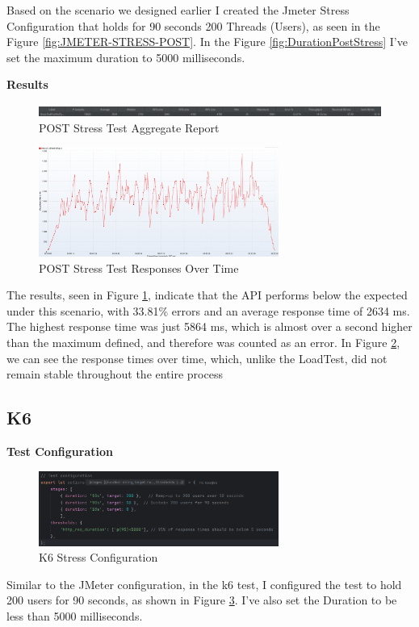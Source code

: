 \documentclass[a4paper,11pt,openright,BCOR=15mm]{scrbook}
\begin{document}
		Based on the scenario we designed earlier I created the Jmeter Stress Configuration that holds for 90 seconds 200 Threads (Users), as seen in the Figure \ref{fig:JMETER-STRESS-POST}. In the Figure \ref{fig:DurationPostStress} I've set the maximum duration to 5000 milliseconds.

		
		\textbf{Results}
		\begin{figure}[H]
			\centering
			\includegraphics[width=\textwidth]{figs/Performance/Results/JMETER POST STRESS AR.png}
			\caption{POST Stress Test Aggregate Report}
			\label{fig:POSTStressAggregateReport}
		\end{figure}
		\begin{figure}[H]
			\centering
			\includegraphics[width=0.7\textwidth]{figs/Performance/Results/JMETER POST STRESS ROT.png}
			\caption{POST Stress Test Responses Over Time}
			\label{fig:POSTStressResposesOverTime}
		\end{figure}

		The results, seen in Figure \ref{fig:POSTStressAggregateReport}, indicate that the API performs below the expected under this scenario, with 33.81\% errors and an average response time of 2634 ms. The highest response time was just 5864 ms, which is almost over a second higher than the maximum defined, and therefore was counted as an error.
		In Figure \ref{fig:POSTStressResposesOverTime}, we can see the response times over time, which, unlike the LoadTest, did not remain stable throughout the entire process	


		\subsection{K6}
		\textbf{Test Configuration}
		\begin{figure}[H]
			\centering
			\includegraphics[width=0.7\textwidth]{figs/Performance/Test Configuration/K6-STRESS.png}
			\caption{K6 Stress Configuration}
			\label{fig:K6-STRESS-POST}
		\end{figure}
		Similar to the JMeter configuration, in the k6 test, I configured the test to hold 200 users for 90 seconds, as shown in Figure \ref{fig:K6-STRESS-POST}. I've also set the Duration to be less than 5000 milliseconds.
		
\end{document}

